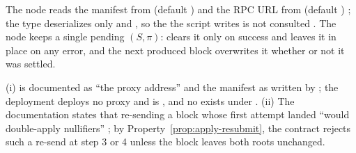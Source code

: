 \begin{property}
The node reads the manifest from  (default
) and the RPC URL from
 (default )
; the  type
deserializes only  and , so the  the
script writes is not consulted
. The node keeps a
single pending $(S,\pi)$:  clears it only on success and leaves it
in place on any error, and the next produced block overwrites it whether or
not it was settled.
\end{property}

\begin{specdelta}
\label{delta:settle-docs}
(i)  is documented as ``the  proxy
address'' and the manifest as written by 
; the deployment
deploys no proxy and is , and no 
exists under .
(ii) The  documentation states that re-sending a block whose first
attempt landed ``would double-apply nullifiers''
; by
Property~\ref{prop:apply-resubmit}, the contract rejects such a re-send at
step 3 or 4 unless the block leaves both roots unchanged.
\end{specdelta}
